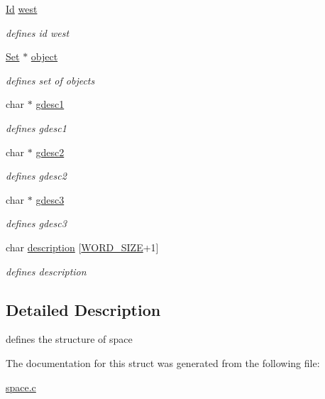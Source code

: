 \begin{DoxyCompactItemize}
\mbox{\label{struct__Space_a20c1d259e93b44e24ba82982e142eb9b}} 
\hyperlink{types_8h_a845e604fb28f7e3d97549da3448149d3}{Id} \hyperlink{struct__Space_a20c1d259e93b44e24ba82982e142eb9b}{west}
\begin{DoxyCompactList}\small\item\em defines id west \end{DoxyCompactList}\item 
\mbox{\label{struct__Space_af55fb96d4a4fc2028959c409c8fadaf0}} 
\hyperlink{set_8h_a6d3b7f7c92cbb4577ef3ef7ddbf93161}{Set} $\ast$ \hyperlink{struct__Space_af55fb96d4a4fc2028959c409c8fadaf0}{object}
\begin{DoxyCompactList}\small\item\em defines set of objects \end{DoxyCompactList}\item 
\mbox{\label{struct__Space_ab77f924c8f24489481b08653abc2aea7}} 
char $\ast$ \hyperlink{struct__Space_ab77f924c8f24489481b08653abc2aea7}{gdesc1}
\begin{DoxyCompactList}\small\item\em defines gdesc1 \end{DoxyCompactList}\item 
\mbox{\label{struct__Space_a0d4c7df1824c7d6d8bcdb01c39e963b3}} 
char $\ast$ \hyperlink{struct__Space_a0d4c7df1824c7d6d8bcdb01c39e963b3}{gdesc2}
\begin{DoxyCompactList}\small\item\em defines gdesc2 \end{DoxyCompactList}\item 
\mbox{\label{struct__Space_a16ac903ceb338bd5730bab4e63ddbce4}} 
char $\ast$ \hyperlink{struct__Space_a16ac903ceb338bd5730bab4e63ddbce4}{gdesc3}
\begin{DoxyCompactList}\small\item\em defines gdesc3 \end{DoxyCompactList}\item 
\mbox{\label{struct__Space_a41a1dbfab1d88b732db50d7335c2f328}} 
char \hyperlink{struct__Space_a41a1dbfab1d88b732db50d7335c2f328}{description} \mbox{[}\hyperlink{types_8h_a92ed8507d1cd2331ad09275c5c4c1c89}{W\+O\+R\+D\+\_\+\+S\+I\+ZE}+1\mbox{]}
\begin{DoxyCompactList}\small\item\em defines description \end{DoxyCompactList}\end{DoxyCompactItemize}


\subsection{Detailed Description}
defines the structure of space 

The documentation for this struct was generated from the following file\+:\begin{DoxyCompactItemize}
\item 
\hyperlink{space_8c}{space.\+c}\end{DoxyCompactItemize}

